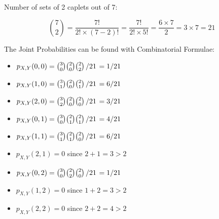 \documentclass[notes=show,handout]{beamer}\usepackage[]{graphicx}\usepackage[]{color}
\begin{document}
\begin{frame}{\secname}
  \begin{example}[Caplets]
  \begin{footnotesize}

  Number of sets of 2 caplets out of 7:

  $${7 \choose 2} = \frac{7!}{2!\times (7-2)!} = \frac{7!}{2! \times 5!} = \frac{6\times 7}{2} = 3\times 7 = 21$$

  \end{footnotesize}
  \end{example}
\end{frame}


\begin{frame}{\secname}
  \begin{example}[continued]
  \begin{footnotesize}

  The Joint Probabilities can be found with Combinatorial Formulae:

  \begin{itemize}
  \item $p_{X,Y}(0, 0) = {3 \choose 0}{2 \choose 0}{2 \choose 2} \left/ 21 \right. = 1/21$
  \item $p_{X,Y}(1, 0) = {3 \choose 1}{2 \choose 0}{2 \choose 1} \left/ 21 \right. = 6/21$
  \item $p_{X,Y}(2, 0) = {3 \choose 2}{2 \choose 0}{2 \choose 0} \left/ 21 \right. = 3/21$
  \item $p_{X,Y}(0, 1) = {3 \choose 0}{2 \choose 1}{2 \choose 1} \left/ 21 \right. = 4/21$
  \item $p_{X,Y}(1, 1) = {3 \choose 1}{2 \choose 1}{2 \choose 0} \left/ 21 \right. = 6/21$
  \item $p_{X,Y}(2, 1) = 0$ since $2+1 = 3 > 2$
  \item $p_{X,Y}(0, 2) = {3 \choose 0}{2 \choose 2}{2 \choose 0} \left/ 21 \right. = 1/21$
  \item $p_{X,Y}(1, 2) = 0$ since $1+2 = 3 > 2$
  \item $p_{X,Y}(2, 2) = 0$ since $2+2 = 4 > 2$
  \end{itemize}

  \end{footnotesize}
  \end{example}
\end{frame}
\end{document}

